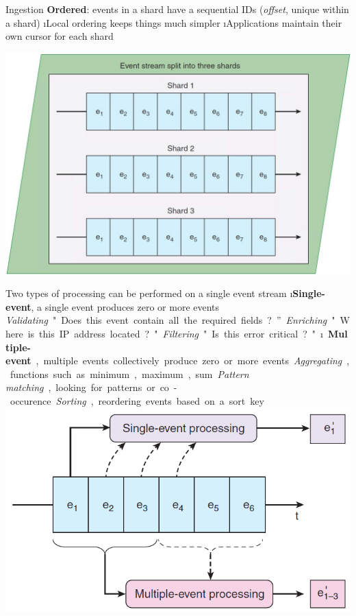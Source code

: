 \begin{frame}[allowframebreaks]{Ingestion}
\textbf{Ordered}: events in a shard have a sequential IDs (\textit{offset}, unique within a shard)
\i Local ordering keeps things much simpler
\i Applications maintain their own cursor for each shard

\includegraphics[width=.4\linewidth]{imgs/eventstream_order.jpg}

\framebreak
Two types of processing can be performed on a single event stream
\i \textbf{Single-event}, a single event produces zero or more events
\si \textit{Validating} "Does this event contain all the required fields?”
\si \textit{Enriching} "Where is this IP address located?"
\si \textit{Filtering} "Is this error critical?"
\i \textbf{Multiple-event}, multiple events collectively produce zero or more events
\si \textit{Aggregating}, functions such as minimum, maximum, sum
\si \textit{Pattern matching}, looking for patterns or co-occurence
\si \textit{Sorting}, reordering events based on a sort key

\includegraphics[width=.8\linewidth]{imgs/eventstream_processing.jpg}


\end{frame}
